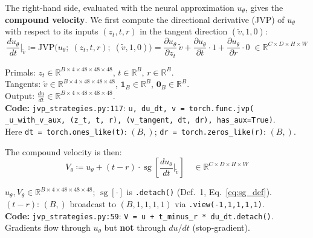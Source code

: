 \documentclass[11pt,a4paper]{article}
\newcommand{\jvp}{\mathrm{JVP}}
\newcommand{\code}[1]{\texttt{#1}}
\DeclareMathOperator{\sg}{sg}        %
\begin{document}
\noindent
The right-hand side, evaluated with the neural approximation $u_\theta$, gives
the \textbf{compound velocity}.  We first compute the directional derivative
(JVP) of $u_\theta$ with respect to its inputs $(z_t, t, r)$ in the tangent
direction $(\tilde{v}, 1, 0)$:
\begin{equation}
  \frac{du_\theta}{dt}\bigg|_{\tilde{v}}
    \coloneqq \jvp\!\bigl(u_\theta;\;(z_t,t,r);\;(\tilde{v},1,0)\bigr)
    = \frac{\partial u_\theta}{\partial z_t}\,\tilde{v}
      + \frac{\partial u_\theta}{\partial t}\cdot 1
      + \frac{\partial u_\theta}{\partial r}\cdot 0
    \;\in \mathbb{R}^{C \times D \times H \times W}
  \label{eq:jvp_def}
\end{equation}
\begin{shapes}
Primals: $z_t \in \mathbb{R}^{B \times 4 \times 48 \times 48 \times 48}$,
$t \in \mathbb{R}^{B}$, $r \in \mathbb{R}^{B}$.\\
Tangents: $\tilde{v} \in \mathbb{R}^{B \times 4 \times 48 \times 48 \times 48}$,
$\mathbf{1}_B \in \mathbb{R}^{B}$, $\mathbf{0}_B \in \mathbb{R}^{B}$.\\
Output: $\frac{du}{dt} \in \mathbb{R}^{B \times 4 \times 48 \times 48 \times 48}$.\\
\textbf{Code:} \code{jvp\_strategies.py:117}: \code{u, du\_dt, v = torch.func.jvp(}\\
\code{\quad \_u\_with\_v\_aux, (z\_t, t, r), (v\_tangent, dt, dr), has\_aux=True)}.\\
Here \code{dt = torch.ones\_like(t)}: $(B,)$; \code{dr = torch.zeros\_like(r)}: $(B,)$.
\end{shapes}

\noindent
The compound velocity is then:
\begin{equation}
  \boxed{
  V_\theta
    \coloneqq u_\theta
      + (t - r) \cdot \sg\!\left[\frac{du_\theta}{dt}\bigg|_{\tilde{v}}\right]
  }
  \quad \in \mathbb{R}^{C \times D \times H \times W}
  \label{eq:compound_V}
\end{equation}
\begin{shapes}
$u_\theta, V_\theta \in \mathbb{R}^{B \times 4 \times 48 \times 48 \times 48}$;
$\sg[\cdot]$ is \code{.detach()} (Def.~1, Eq.~\ref{eq:sg_def}).\\
$(t-r)$: $(B,)$ broadcast to $(B,1,1,1,1)$ via \code{.view(-1,1,1,1,1)}.\\
\textbf{Code:} \code{jvp\_strategies.py:59}:
\code{V = u + t\_minus\_r * du\_dt.detach()}.\\
Gradients flow through $u_\theta$ but \textbf{not} through $du/dt$ (stop-gradient).
\end{shapes}
\end{document}

